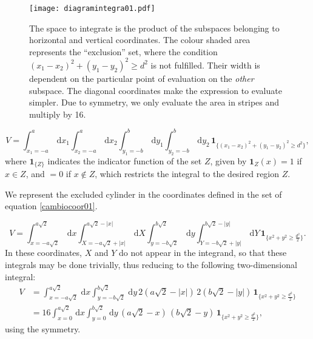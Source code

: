 \documentclass[a4paper,10pt]{article}
\newcommand{\rd}{\, \mathrm{d}}
\newcommand{\indicator}[1]{\mathbf{1}_{ \{   #1 \} } }
\begin{document}
\begin{figure}[h]
  \centering
  \texttt{[image: diagramintegra01.pdf]}
  \caption{The space to integrate is the product of the subspaces
    belonging to horizontal and vertical coordinates. The colour
    shaded area represents the ``exclusion'' set, where the condition 
    $ (x_1-x_2)^2 + (y_1-y_2)^2 \ge d^2 $ is not fulfilled. 
    Their width is dependent on the particular point of evaluation
    on the \emph{other} subspace. The diagonal coordinates
    make the expression to evaluate simpler. Due to 
    symmetry, we only evaluate the area in stripes and
    multiply by 16.}\label{diagintegra01}
\end{figure}

\begin{equation}
 V = \int_{x_1 = -a}^a \rd x_1 \int_{x_2 = -a}^a \rd x_2 
\int_{y_1 = -b}^b \rd y_1 \int_{y_2 = -b}^b \rd y_2 \, \indicator{ (x_1-x_2)^2 + (y_1-y_2)^2 \ge d^2 },
\end{equation}
where $\indicator{Z}$ indicates the indicator function of the set $Z$, given by $\mathbf{1}_Z (x) = 1$ if $x \in Z$, and $=0$ if $x \notin Z$, which restricts the integral to the desired region $Z$.

We represent the excluded cylinder in the coordinates defined in 
the set of equation \ref{cambiocoor01}. 

\begin{equation}
 V = \int_{x=-a \sqrt{2}}^{a \sqrt{2}} \rd x 
\int_{X=-a \sqrt{2} + |x| }^{a \sqrt{2} - |x|}  \rd X
 \int_{y=-b \sqrt{2}}^{b \sqrt{2}} \rd y
\int_{Y=-b \sqrt{2} + |y| }^{b \sqrt{2}-|y|}  \rd Y
\, \indicator{ x^2 + y^2 \ge \frac{d^2}{2}  }.
\end{equation}
In these coordinates, $X$ and $Y$ do not appear in the integrand, so that these integrals may be done trivially, thus reducing to the following two-dimensional integral:
\begin{align}
 V &= \int_{x=-a \sqrt{2}}^{a \sqrt{2}} \rd x  \int_{y=-b \sqrt{2}}^{b \sqrt{2}} \rd y
\, 2 \left( a \sqrt{2} - |x| \right) \, 2 \left( b \sqrt{2} - |y| \right) \,  \indicator{ x^2 + y^2 \ge \frac{d^2}{2} } \\
&= 16 \int_{x=0}^{a \sqrt{2}} \rd x  \int_{y=0}^{b \sqrt{2}} \rd y
\, \left( a \sqrt{2} - x \right) \, \left( b \sqrt{2} - y \right) \,  \indicator{ x^2 + y^2 \ge \frac{d^2}{2} },
\end{align}
using the symmetry.
\end{document}
